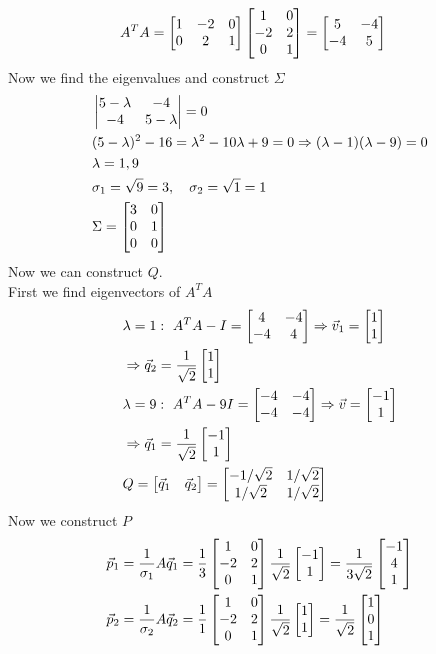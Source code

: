 \documentclass[11pt, fleqn]{article}
\begin{document}
\begin{align*}
    &A^TA=\matrixx{1 & -2 & 0\\ 0 & 2 & 1}\matrixx{1 & 0\\ -2 & 2\\ 0 & 1}=\matrixx{5 & -4\\ -4 & 5}
\end{align*}
Now we find the eigenvalues and construct $\Sigma$
\begin{align*}
    &\detmatrix{5-\lambda & -4\\ -4 & 5-\lambda}=0\\
    &(5-\lambda)^2-16=\lambda^2-10\lambda+9=0\Ra (\lambda-1)(\lambda-9)=0\\
    &\lambda=1,9\\
    &\sigma_1=\sqrt{9}=3,\quad \sigma_2=\sqrt{1}=1\\
    &\Sigma=\matrixx{3 & 0\\ 0 & 1\\ 0 & 0}
\end{align*}
Now we can construct $Q$.\\
First we find eigenvectors of $A^TA$
\begin{align*}
    &\lambda=1:\ A^TA-I=\matrixx{4 & -4\\ -4 & 4}\Ra \vec{v}_1=\matrixx{1\\1}\\
    &\Ra \vec{q}_2=\frac{1}{\sqrt{2}}\matrixx{1\\1}\\
    &\lambda=9:\ A^TA-9I=\matrixx{-4 & -4\\ -4 & -4}\Ra \vec{v}=\matrixx{-1\\1}\\
    &\Ra \vec{q}_1=\frac{1}{\sqrt{2}}\matrixx{-1\\1}\\
    &Q=\matrixx{\vec{q}_1 & \vec{q}_2}=\matrixx{-1/\sqrt{2} & 1/\sqrt{2}\\ 1/\sqrt{2} & 1/\sqrt{2}}
\end{align*}
Now we construct $P$
\begin{align*}
    &\vec{p}_1=\frac{1}{\sigma_1}A\vec{q}_1=\frac{1}{3}\matrixx{1 & 0\\ -2 & 2\\ 0 & 1}\frac{1}{\sqrt{2}}\matrixx{-1\\1}=\frac{1}{3\sqrt{2}}\matrixx{-1\\4\\1}\\
    &\vec{p}_2=\frac{1}{\sigma_2}A\vec{q}_2=\frac{1}{1}\matrixx{1 & 0\\ -2 & 2\\ 0 & 1}\frac{1}{\sqrt{2}}\matrixx{1\\1}=\frac{1}{\sqrt{2}}\matrixx{1\\0\\1}
\end{align*}
\end{document}
